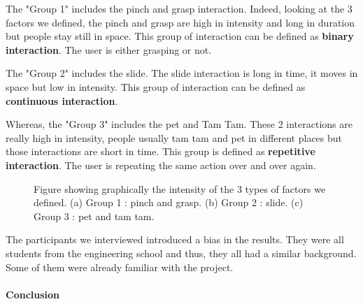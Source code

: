 The "Group 1" includes the pinch and grasp interaction. Indeed, looking at the 3 factors we defined, 
the pinch and grasp are high in intensity and long in duration but people stay still in space.
This group of interaction can be defined as \textbf{binary interaction}. The user is either grasping or not.

The "Group 2" includes the slide. The slide interaction is long in time, it moves in space but low in intensity.
This group of interaction can be defined as \textbf{continuous interaction}.


Whereas, the "Group 3" includes the pet and Tam Tam. 
These 2 interactions are really high in intensity, people usually tam tam and pet in different places but those interactions are short in time. 
This group is defined as \textbf{repetitive interaction}. The user is repeating the same action over and over again.


\begin{figure}

    \begin{minipage}{.5\linewidth}
    \centering
    \end{minipage}%
    \begin{minipage}{.5\linewidth}
    \centering
    \end{minipage}\par\medskip
    \centering
    
    \caption{Figure showing graphically the intensity of the 3 types of factors we defined. (a) Group 1 : pinch and grasp. (b) Group 2 : slide. (c) Group 3 : pet and tam tam.}
    \label{fig:main}
    \end{figure}


The participants we interviewed introduced a bias in the results.
They were all students from the engineering school and thus, they all had a similar background.
Some of them were already familiar with the project.

\paragraph{Conclusion}

